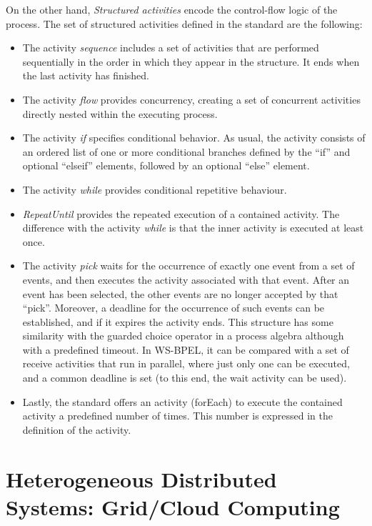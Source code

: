 On the other hand, \emph{Structured activities} encode the control-flow logic of the process.
The set of structured activities defined in the standard are the following:
\begin{itemize}
\item The activity \emph{sequence} includes a set of activities that are performed sequentially in the
order in which they appear in the structure. It ends
when the last activity has finished.
\item The activity \emph{flow} provides concurrency,  creating 
a set of concurrent activities directly nested within the executing process. %
\item The activity \emph{if} specifies conditional behavior. As usual, the activity consists of an ordered list of one or
more conditional branches defined by the ``if'' and optional ``elseif'' elements, followed by an
optional ``else'' element.
\item The activity \emph{while} provides conditional repetitive behaviour.
\item \emph{RepeatUntil} provides the repeated execution of a contained activity. The difference with
the activity \emph{while} is that the inner activity is executed at least once.
\item The activity \emph{pick} waits for the occurrence of exactly one event from a set of events, and then
executes the activity associated with that event. After an event has been selected, the other events
are no longer accepted by that ``pick''. Moreover, a deadline for the occurrence of such events can be established,
and if it expires the activity ends. This structure has some similarity with the guarded choice operator in
a process algebra although with a predefined timeout. 
In WS-BPEL, it can be compared with a set of receive activities that run in parallel, where just only one can be executed,
and a common deadline is set (to this end, the wait activity can be used).
\item Lastly, the standard offers an activity (forEach) to execute the contained activity a predefined number of times. This number
 is expressed in the definition of the activity.
\end{itemize}


\section{Heterogeneous Distributed Systems: Grid/Cloud Computing}


